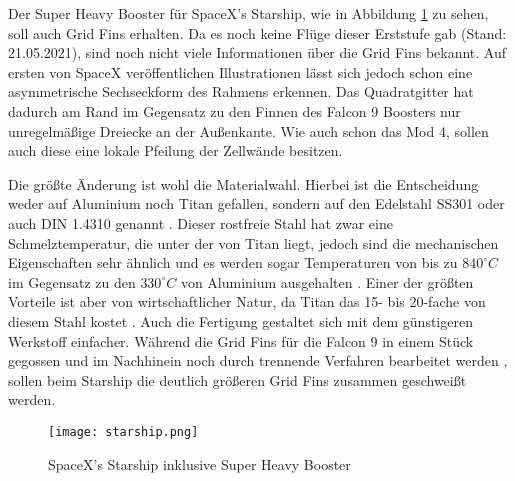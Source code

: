 Der Super Heavy Booster für SpaceX's Starship, wie in Abbildung \ref{abb_starship} zu sehen, soll auch Grid Fins erhalten. Da es noch keine Flüge dieser Erststufe gab (Stand: 21.05.2021), sind noch nicht viele Informationen über die Grid Fins bekannt. Auf ersten von SpaceX veröffentlichen Illustrationen lässt sich jedoch schon eine asymmetrische Sechseckform des Rahmens erkennen. Das Quadratgitter hat dadurch am Rand im Gegensatz zu den Finnen des Falcon 9 Boosters nur unregelmäßige Dreiecke an der Außenkante. Wie auch schon das Mod 4, sollen auch diese eine lokale Pfeilung der Zellwände besitzen.

Die größte Änderung ist wohl die Materialwahl. Hierbei ist die Entscheidung weder auf Aluminium noch Titan gefallen, sondern auf den Edelstahl SS301 oder auch DIN 1.4310 genannt \cite{titanium}. Dieser rostfreie Stahl hat zwar eine Schmelztemperatur, die unter der von Titan liegt, jedoch sind die mechanischen Eigenschaften sehr ähnlich und es werden sogar Temperaturen von bis zu $840^\circ C$ im Gegensatz zu den $330^\circ C$ von Aluminium ausgehalten \cite{titanium}. Einer der größten Vorteile ist aber von wirtschaftlicher Natur, da Titan das 15- bis 20-fache von diesem Stahl kostet \cite{titanium}. Auch die Fertigung gestaltet sich mit dem günstigeren Werkstoff einfacher. Während die Grid Fins für die Falcon 9 in einem Stück gegossen und im Nachhinein noch durch trennende Verfahren bearbeitet werden \cite{titanium}, sollen beim Starship die deutlich größeren Grid Fins zusammen geschweißt werden.
\begin{figure}[h]
	\centering
	\texttt{[image: starship.png]}
	\begin{flushright}
	\end{flushright}
	\caption{SpaceX's Starship inklusive Super Heavy Booster}
	\label{abb_starship}
\end{figure}\\
